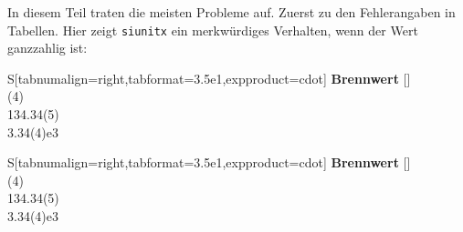 \begin{minipage}\textwidth
{}
In diesem Teil traten die meisten Probleme auf. Zuerst zu den Fehlerangaben in Tabellen.
Hier zeigt \verb+siunitx+ ein merkwürdiges Verhalten, wenn der Wert ganzzahlig ist:
\begin{lcode}
\begin{table}
	\centering
	\begin{tabular}{S[tabnumalign=right,tabformat=3.5e1,expproduct=cdot]}
		\tobrule
		\textbf{Brennwert} [\kilo\joule] \\
		(4)	\\
		134.34(5)	\\
		3.34(4)e3	\\
		\bottomrule
	\end{tabular}
\end{table}
\end{lcode}
\begin{center}
	\begin{tabular}{S[tabnumalign=right,tabformat=3.5e1,expproduct=cdot]}
		\toprule
		\textbf{Brennwert} [\kilo\joule] \\
		(4)	\\
		134.34(5)	\\
		3.34(4)e3	\\
		\bottomrule
	\end{tabular}
\end{center}
\end{minipage}

